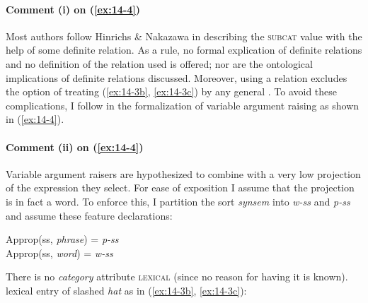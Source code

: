 \documentclass[output=paper]{LSP/langsci}
\begin{document}
\paragraph*{Comment (i) on (\ref{ex:14-4})}\randnum\label{rn:14-10} Most authors follow Hinrichs \& Nakazawa in describing the \textsc{subcat} value with the help of some definite relation. As a rule, no formal explication of definite relations and no definition of the relation used is offered; nor are the ontological implications of definite relations discussed. Moreover, using a relation excludes the option of treating (\ref{ex:14-3b}, \ref{ex:14-3c}) by any general . To avoid these complications, I follow \citet{Meurers94} in the formalization of variable argument raising as shown in (\ref{ex:14-4}).

\paragraph*{Comment (ii) on (\ref{ex:14-4})}\randnum\label{rn:14-11} Variable argument raisers are hypothesized to combine with a very low projection of the expression they select. For ease of exposition I assume that the projection is in fact a word. To enforce this, I partition the sort \textit{synsem} into \textit{w-ss} and \textit{p-ss} and assume these feature declarations:
\begin{exe}
\ex
Approp(ss, \textit{phrase}) = \textit{p-ss} \\
Approp(ss, \textit{word}) = \textit{w-ss}
\end{exe}
There is no \textit{category} attribute \textsc{lexical} (since no reason for having it is known).
\eas
\label{ex:14-5}
\randnum\label{rn:14-12}lexical entry of slashed \textit{hat} as in (\ref{ex:14-3b}, \ref{ex:14-3c}): \\
\end{document}
